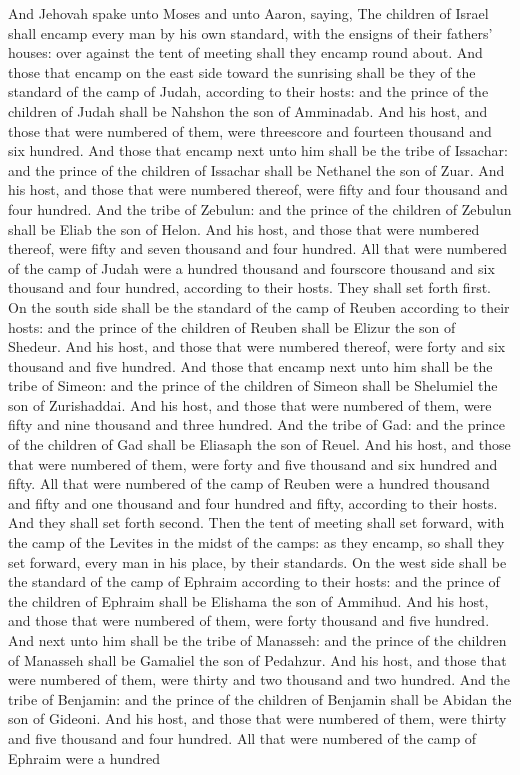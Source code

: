 And Jehovah spake unto Moses and unto Aaron, saying, The children of Israel shall encamp every man by his own standard, with the ensigns of their fathers’ houses: over against the tent of meeting shall they encamp round about. And those that encamp on the east side toward the sunrising shall be they of the standard of the camp of Judah, according to their hosts: and the prince of the children of Judah shall be Nahshon the son of Amminadab. And his host, and those that were numbered of them, were threescore and fourteen thousand and six hundred. And those that encamp next unto him shall be the tribe of Issachar: and the prince of the children of Issachar shall be Nethanel the son of Zuar. And his host, and those that were numbered thereof, were fifty and four thousand and four hundred. And the tribe of Zebulun: and the prince of the children of Zebulun shall be Eliab the son of Helon. And his host, and those that were numbered thereof, were fifty and seven thousand and four hundred. All that were numbered of the camp of Judah were a hundred thousand and fourscore thousand and six thousand and four hundred, according to their hosts. They shall set forth first.  On the south side shall be the standard of the camp of Reuben according to their hosts: and the prince of the children of Reuben shall be Elizur the son of Shedeur. And his host, and those that were numbered thereof, were forty and six thousand and five hundred. And those that encamp next unto him shall be the tribe of Simeon: and the prince of the children of Simeon shall be Shelumiel the son of Zurishaddai. And his host, and those that were numbered of them, were fifty and nine thousand and three hundred. And the tribe of Gad: and the prince of the children of Gad shall be Eliasaph the son of Reuel. And his host, and those that were numbered of them, were forty and five thousand and six hundred and fifty. All that were numbered of the camp of Reuben were a hundred thousand and fifty and one thousand and four hundred and fifty, according to their hosts. And they shall set forth second.  Then the tent of meeting shall set forward, with the camp of the Levites in the midst of the camps: as they encamp, so shall they set forward, every man in his place, by their standards.  On the west side shall be the standard of the camp of Ephraim according to their hosts: and the prince of the children of Ephraim shall be Elishama the son of Ammihud. And his host, and those that were numbered of them, were forty thousand and five hundred. And next unto him shall be the tribe of Manasseh: and the prince of the children of Manasseh shall be Gamaliel the son of Pedahzur. And his host, and those that were numbered of them, were thirty and two thousand and two hundred. And the tribe of Benjamin: and the prince of the children of Benjamin shall be Abidan the son of Gideoni. And his host, and those that were numbered of them, were thirty and five thousand and four hundred. All that were numbered of the camp of Ephraim were a hundred 